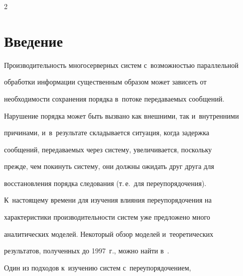 















\thispagestyle{headings}





\begin{multicols}{2}





\label{st\stat}





\section{Введение}





Производительность многосерверных систем с~возможностью параллельной


обработки информации существенным образом может зависеть от


необходимости сохранения порядка в~потоке передаваемых сообщений.


Нарушение порядка может быть вызвано как внешними, так и~внутренними


причинами, и~в~результате складывается ситуация, когда задержка


сообщений, передаваемых через сис\-те\-му, увеличивается, поскольку


прежде, чем покинуть систему, они должны ожидать друг друга для


восстановления порядка следования (т.\,е.\ для переупорядочения). 





К~настоящему времени для изучения влияния переупорядочения на


характеристики производительности сис\-тем уже предложено много


аналитических моделей. Некоторый обзор моделей и~тео\-ре\-ти\-че\-ских


результатов, полученных до 1997~г., можно найти в~\cite{new7, new8}. 


Один из подходов к~изуче\-нию сис\-тем с~переупорядочением,



\end{multicols}
